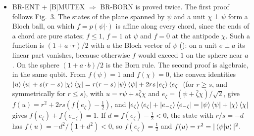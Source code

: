 \documentclass[11pt]{article}
\begin{document}
\begin{itemize}
  [B]MUTEX implies another over EQST, when $E$ has two orthonormal vectors (in dimension at most
  one, EQST alone implies BR-BORN). The model for [B]MUTEX alone satisfies it in a degenerate
  way: $p(\psi|\phi) \ge \tfrac12$ for all pure states, so no two states are mutually exclusive,
  and every mixture of two or more states has entropy $0$ or $\infty$, never a Shannon entropy
  $\log 2$. In each model the failure of one of the two remaining conditions follows from
  Theorem~9.
\item BR-ENT + [B]MUTEX $\Rightarrow$ BR-BORN is proved twice. The first proof follows Fig.~3.
  The states of the plane spanned by $\psi$ and a unit $\chi \perp \psi$ form a Bloch ball, on
  which $f = p(\psi|\cdot)$ is affine along every chord, since the ends of a chord are pure states;
  $f \le 1$, $f = 1$ at $\psi$ and $f = 0$ at the antipode $\chi$. Such a function is
  $(1 + a\cdot r)/2$ with $a$ the Bloch vector of $\psi$ (): on a unit
  $e \perp a$ its linear part vanishes, because otherwise $f$ would exceed $1$ on the sphere near
  $a$. On the sphere $(1 + a\cdot b)/2$ is the Born rule. The second proof is algebraic, in the
  same qubit. From $f(\psi) = 1$ and $f(\chi) = 0$, the convex identities
  $\ket u\bra u + s(r - s)\ket\chi\bra\chi =
  r(r - s)\ket\psi\bra\psi + 2rs\ket{e_\zeta}\bra{e_\zeta}$
  (for $r \ge s$, and symmetrically for $r \le s$), with $u = r\psi + s\bar\zeta\chi$ and
  $e_\zeta = (\psi + \bar\zeta\chi)/\sqrt2$, give $f(u) = r^2 + 2rs(f(e_\zeta) - \tfrac12)$, and
  $\ket{e_\zeta}\bra{e_\zeta} + \ket{e_{-\zeta}}\bra{e_{-\zeta}} = \ket\psi\bra\psi +
  \ket\chi\bra\chi$ gives $f(e_\zeta) + f(e_{-\zeta}) = 1$. If $d = f(e_\zeta) - \tfrac12 < 0$,
  the state with $r/s = -d$ has $f(u) = -d^2/(1 + d^2) < 0$, so $f(e_\zeta) = \tfrac12$ and
  $f(u) = r^2 = |\braket{\psi|u}|^2$.
\end{itemize}
\end{document}
